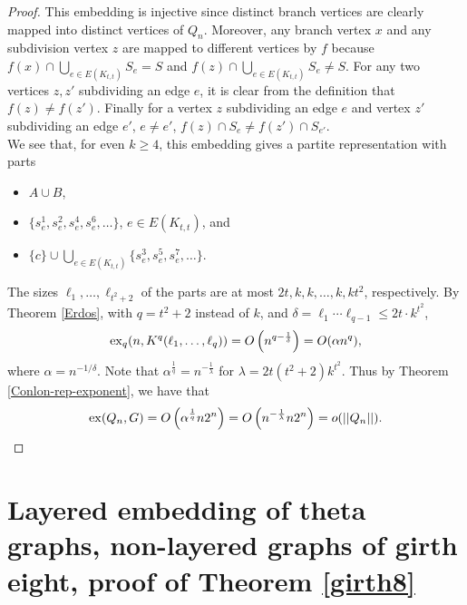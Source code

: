 \documentclass[11pt, a4paper]{article}
\newcommand{\ex}{{\rm  ex}}
\begin{document}
\begin{proof}
 
This embedding is injective since distinct branch vertices are clearly mapped into distinct vertices of $Q_n$. Moreover, any branch vertex $x$ and any subdivision vertex $z$ are mapped to different vertices by $f$ because $f(x) \cap \bigcup_{e\in E(K_{t,t})} S_e = S$ and $f(z)  \cap \bigcup_{e\in E(K_{t,t})} S_e \neq S$.
For any two vertices $z, z'$ subdividing an edge $e$, it is clear from the definition that $f(z)\neq f(z')$. 
Finally for a vertex $z$ subdividing an edge $e$ and vertex $z'$ subdividing an edge $e'$,  $e\neq e'$, $f(z) \cap S_e \neq f(z') \cap S_{e'}$.\\


We see that, for even $k\geq 4$,  this embedding gives a partite representation with parts
\begin{itemize}
\item{}
$A\cup B$, 
\item{} $\{s_e^1, s_e^2, s_e^4, s_e^6, \ldots \}$, $e\in E(K_{t,t})$, and 
\item{} 
$\{c\} \cup   \bigcup_{e\in E(K_{t,t})} \{s_e^3, s_e^5, s_e^7, \ldots\}.$
\end{itemize}

The sizes  $\ell_1, \ldots, \ell_{t^2+2}$ of the parts are at most $2t, k, k, \ldots, k, kt^2$, respectively.
By  Theorem \ref{Erdos}, with $q= t^2+2$ instead of $k$, and $\delta = \ell_1 \cdots \ell_{q-1} \leq 2t\cdot k^{t^2}$,   $$\ex_{q}(n, K^{q}(\ell_1, \ldots, \ell_{q})) = O\left(n^{q - \frac{1}{\delta}}\right) = O(\alpha n^{q}),$$ 
where  $\alpha =  n^{-1/\delta}.$ Note that $\alpha^{\frac{1}{q}}=n^{-\frac{{1}}{\lambda}}$ for $\lambda=2t(t^2+2)k^{t^2}$.
Thus by Theorem \ref{Conlon-rep-exponent}, we have that  $$\ex(Q_n, G) =  O\left(\alpha^{\frac{1}{q}} n2^n\right)=  O\left(n^{-\frac{{1}}{\lambda}} n2^n\right) = o(||Q_n||).$$
\end{proof}	
	
	
	
	
	
		

\section{Layered embedding of  theta graphs, non-layered graphs of girth eight, proof of Theorem \ref{girth8}}	\label{girth}
\end{document}
